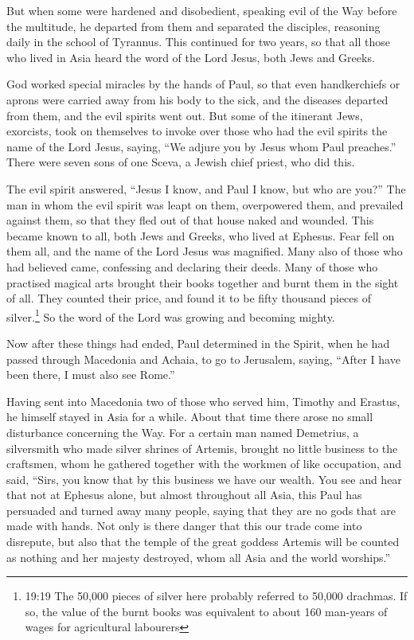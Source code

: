 But when some were hardened and disobedient, speaking evil
of the Way before the multitude, he departed from them and separated the
disciples, reasoning daily in the school of Tyrannus.  This
continued for two years, so that all those who lived in Asia heard the
word of the Lord Jesus, both Jews and Greeks.

 God worked special miracles by the hands of Paul,
 so that even handkerchiefs or aprons were carried away
from his body to the sick, and the diseases departed from them, and the
evil spirits went out.  But some of the itinerant Jews,
exorcists, took on themselves to invoke over those who had the evil
spirits the name of the Lord Jesus, saying, ``We adjure you by Jesus
whom Paul preaches.''  There were seven sons of one Sceva,
a Jewish chief priest, who did this.

 The evil spirit answered, ``Jesus I know, and Paul I know,
but who are you?''  The man in whom the evil spirit was
leapt on them, overpowered them, and prevailed against them, so that
they fled out of that house naked and wounded.  This became
known to all, both Jews and Greeks, who lived at Ephesus. Fear fell on
them all, and the name of the Lord Jesus was magnified. 
Many also of those who had believed came, confessing and declaring their
deeds.  Many of those who practised magical arts brought
their books together and burnt them in the sight of all. They counted
their price, and found it to be fifty thousand pieces of
silver.\footnote{19:19 The 50,000 pieces of silver here probably
  referred to 50,000 drachmas. If so, the value of the burnt books was
  equivalent to about 160 man-years of wages for agricultural labourers}
 So the word of the Lord was growing and becoming mighty.

 Now after these things had ended, Paul determined in the
Spirit, when he had passed through Macedonia and Achaia, to go to
Jerusalem, saying, ``After I have been there, I must also see Rome.''

 Having sent into Macedonia two of those who served him,
Timothy and Erastus, he himself stayed in Asia for a while.
 About that time there arose no small disturbance
concerning the Way.  For a certain man named Demetrius, a
silversmith who made silver shrines of Artemis, brought no little
business to the craftsmen,  whom he gathered together with
the workmen of like occupation, and said, ``Sirs, you know that by this
business we have our wealth.  You see and hear that not at
Ephesus alone, but almost throughout all Asia, this Paul has persuaded
and turned away many people, saying that they are no gods that are made
with hands.  Not only is there danger that this our trade
come into disrepute, but also that the temple of the great goddess
Artemis will be counted as nothing and her majesty destroyed, whom all
Asia and the world worships.''

